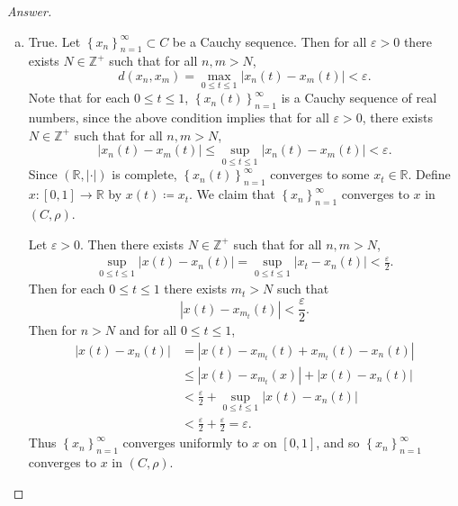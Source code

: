 \documentclass[12pt]{article}
\newcommand{\z}{\mathbb{Z}}
\newcommand{\real}{\mathbb{R}}
\newcommand\setb[1]{\left \{ #1 \right \}}
\newcommand{\eps}{\varepsilon}
\theoremstyle{definition}
\begin{document}
\begin{proof}[Answer]
\begin{enumerate}[(a)]
        \item True. Let $\setb{ x_n }_{n = 1}^{\infty} \subset C$ be a Cauchy sequence. Then for all $\eps > 0$ there exists $N \in \z^+$ such that for all $n , m > N$, 
        \[
            d(x_n , x_m) = \max\limits_{ 0 \leq t \leq 1} \left| x_n(t) - x_m(t) \right| < \eps.
        \]
        Note that for each $0 \leq t \leq 1$, $\setb{ x_n(t) }_{n = 1}^{\infty}$ is a Cauchy sequence of real numbers, since the above condition implies that for all $\eps > 0$, there exists $N \in \z^+$ such that for all $n , m > N$,
        \[
            | x_n(t) - x_m(t) | \leq \sup\limits_{0 \leq t \leq 1} \left| x_n(t) - x_m(t) \right| < \eps.
        \]
        Since $(\real, | \cdot |)$ is complete, $\setb{ x_n(t) }_{n = 1}^{\infty}$ converges to some $x_t \in \real$. Define $x : [0,1] \to \real$ by $x(t) \coloneqq x_t$. We claim that $\setb{ x_n }_{n=1}^{\infty}$ converges to $x$ in $(C,\rho)$. 
    
        Let $\eps > 0$. Then there exists $N \in \z^+$ such that for all $n , m > N$, 
        \begin{align*}
            \sup\limits_{0 \leq t \leq 1} | x(t) - x_n(t) | = \sup\limits_{0 \leq t \leq 1} | x_t - x_n(t) | < \frac{\eps}{2}.
        \end{align*}
        Then for each $0 \leq t \leq 1$ there exists $m_t > N$ such that
        \[
            \left| x(t) - x_{m_t}(t) \right| < \frac{\eps}{2}.
        \]
        Then for $n > N$ and for all $0 \leq t \leq 1$,
        \begin{align*}
            | x(t) - x_n(t) | & = \left| x(t) - x_{m_t}(t)  + x_{m_t}(t) - x_n(t) \right| \\
            & \leq \left| x(t) - x_{m_t}(x) \right| + | x(t) - x_n(t) | \\
            & < \frac{\eps}{2} + \sup\limits_{0 \leq t \leq 1} | x(t) - x_n(t) | \\
            & < \frac{\eps}{2} + \frac{\eps}{2} = \eps.
        \end{align*}
        Thus $\setb{x_n}_{n=1}^{\infty}$ converges uniformly to $x$ on $[0,1]$, and so $\setb{x_n}_{n=1}^{\infty}$ converges to $x$ in $(C,\rho)$.
    

\end{enumerate}
\end{proof}
\end{document}
